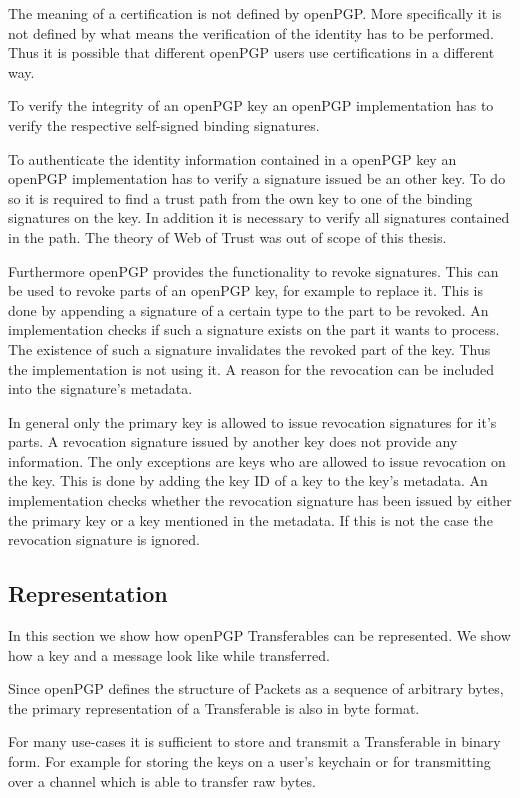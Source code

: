 The meaning of a certification is not defined by openPGP. More specifically it is not defined by what means the verification of the identity has to be performed. Thus it is possible that different openPGP users use certifications in a different way.

To verify the integrity of an openPGP key an openPGP implementation has to verify the respective self-signed binding signatures. 

To authenticate the identity information contained in a openPGP key an openPGP implementation has to verify a signature issued be an other key. To do so it is required to find a trust path from the own key to one of the binding signatures on the key. In addition it is necessary to verify all signatures contained in the path. The theory of Web of Trust was out of scope of this thesis.

Furthermore openPGP provides the functionality to revoke signatures. This can be used to revoke parts of an openPGP key, for example to replace it. This is done by appending a signature of a certain type to the part to be revoked. An implementation checks if such a signature exists on the part it wants to process. The existence of such a signature invalidates the revoked part of the key. Thus the implementation is not using it. A reason for the revocation can be included into the signature's metadata. 

In general only the primary key is allowed to issue revocation signatures for it's parts. A revocation signature issued by another key does not provide any information. The only exceptions are keys who are allowed to issue revocation on the key. This is done by adding the key ID of a key to the key's metadata. An implementation checks whether the revocation signature has been issued by either the primary key or a key mentioned in the metadata. If this is not the case the revocation signature is ignored.

\subsection{Representation}

In this section we show how openPGP Transferables can be represented. We show how a key and a message look like while transferred.

Since openPGP defines the structure of Packets as a sequence of arbitrary bytes, the primary representation of a Transferable is also in byte format.

For many use-cases it is sufficient to store and transmit a Transferable in binary form. For example for storing the keys on a user's keychain or for transmitting over a channel which is able to transfer raw bytes.


